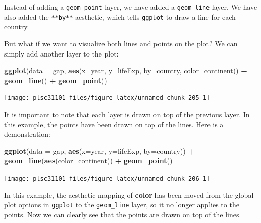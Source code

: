 \documentclass[
]{book}
\newenvironment{Shaded}{\begin{snugshade}}{\end{snugshade}}
\newcommand{\DataTypeTok}[1]{\textcolor[rgb]{0.13,0.29,0.53}{#1}}
\newcommand{\KeywordTok}[1]{\textcolor[rgb]{0.13,0.29,0.53}{\textbf{#1}}}
\newcommand{\NormalTok}[1]{#1}
\newcommand{\OperatorTok}[1]{\textcolor[rgb]{0.81,0.36,0.00}{\textbf{#1}}}
\newcommand{\StringTok}[1]{\textcolor[rgb]{0.31,0.60,0.02}{#1}}
\begin{document}
Instead of adding a \texttt{geom\_point} layer, we have added a \texttt{geom\_line} layer. We have also added the \texttt{**by**} aesthetic, which tells \texttt{ggplot} to draw a line for each country.

But what if we want to visualize both lines and points on the plot? We can simply add another layer to the plot:

\begin{Shaded}
\begin{Highlighting}[]
\KeywordTok{ggplot}\NormalTok{(}\DataTypeTok{data =}\NormalTok{ gap, }\KeywordTok{aes}\NormalTok{(}\DataTypeTok{x=}\NormalTok{year, }\DataTypeTok{y=}\NormalTok{lifeExp, }\DataTypeTok{by=}\NormalTok{country, }\DataTypeTok{color=}\NormalTok{continent)) }\OperatorTok{+}\StringTok{ }
\StringTok{  }\KeywordTok{geom_line}\NormalTok{() }\OperatorTok{+}\StringTok{ }
\StringTok{  }\KeywordTok{geom_point}\NormalTok{()}
\end{Highlighting}
\end{Shaded}

\begin{center}\texttt{[image: plsc31101\_files/figure-latex/unnamed-chunk-205-1]} \end{center}

It is important to note that each layer is drawn on top of the previous layer. In this example, the points have been drawn on top of the lines. Here is a demonstration:

\begin{Shaded}
\begin{Highlighting}[]
\KeywordTok{ggplot}\NormalTok{(}\DataTypeTok{data =}\NormalTok{ gap, }\KeywordTok{aes}\NormalTok{(}\DataTypeTok{x=}\NormalTok{year, }\DataTypeTok{y=}\NormalTok{lifeExp, }\DataTypeTok{by=}\NormalTok{country)) }\OperatorTok{+}\StringTok{ }
\StringTok{  }\KeywordTok{geom_line}\NormalTok{(}\KeywordTok{aes}\NormalTok{(}\DataTypeTok{color=}\NormalTok{continent)) }\OperatorTok{+}\StringTok{ }
\StringTok{  }\KeywordTok{geom_point}\NormalTok{()}
\end{Highlighting}
\end{Shaded}

\begin{center}\texttt{[image: plsc31101\_files/figure-latex/unnamed-chunk-206-1]} \end{center}

In this example, the aesthetic mapping of \textbf{color} has been moved from the global plot options in \texttt{ggplot} to the \texttt{geom\_line} layer, so it no longer applies to the points. Now we can clearly see that the points are drawn on top of the lines.
\end{document}
